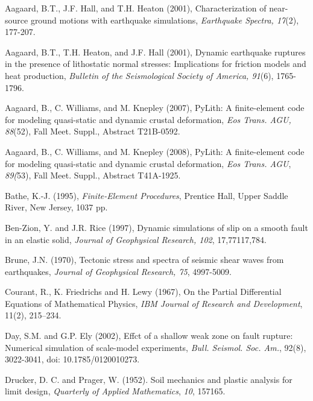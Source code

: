 \documentclass{pylithdoc}
\begin{document}
\begin{thebibliography}{Bibliography}
Aagaard, B.T.,
J.F. Hall, and T.H. Heaton (2001), Characterization of near-source
ground motions with earthquake simulations, \emph{Earthquake Spectra,
17}(2), 177-207.

Aagaard, B.T.,
T.H. Heaton, and J.F. Hall (2001), Dynamic earthquake ruptures in
the presence of lithostatic normal stresses: Implications for friction
models and heat production, \emph{Bulletin of the Seismological Society
of America, 91}(6), 1765-1796.

Aagaard, B., C.
Williams, and M. Knepley (2007), PyLith: A finite-element code for
modeling quasi-static and dynamic crustal deformation, \emph{Eos Trans.
AGU, 88}(52), Fall Meet. Suppl., Abstract T21B-0592.

Aagaard, B., C.
Williams, and M. Knepley (2008), PyLith: A finite-element code for
modeling quasi-static and dynamic crustal deformation, \emph{Eos Trans.
AGU}, \emph{89(}53), Fall Meet. Suppl., Abstract T41A-1925.

Bathe, K.-J. (1995), \textit{Finite-Element
Procedures}, Prentice Hall, Upper Saddle River, New Jersey, 1037 pp.

Ben-Zion, Y.
and J.R. Rice (1997), Dynamic simulations of slip on a smooth fault
in an elastic solid, \emph{Journal of Geophysical Research}\textit{,
102}, 17,771\textendash{}17,784.

Brune, J.N. (1970), Tectonic stress
and spectra of seismic shear waves from earthquakes, \emph{Journal
of Geophysical Research, 75}, 4997-5009.

Courant, R., K.
Friedrichs and H. Lewy (1967), On the Partial Differential Equations
of Mathematical Physics, \textit{IBM Journal of Research and Development},
11(2), 215--234.

Day, S.M. and G.P. Ely (2002),
Effct of a shallow weak zone on fault rupture: Numerical simulation
of scale-model experiments, \textit{Bull. Seismol. Soc. Am.}, 92(8),
3022-3041, doi: 10.1785/0120010273.

Drucker, D.
C. and Prager, W. (1952). Soil mechanics and plastic analysis for
limit design, \textit{Quarterly of Applied Mathematics}, \textit{10},
157\textendash{}165.


\end{thebibliography}
\end{document}
